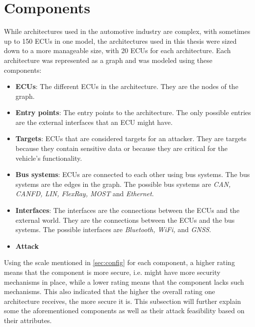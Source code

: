 \section{Components}
\label{sec:components}

While architectures used in the automotive industry are complex, with sometimes up to 150 ECUs in one model, 
the architectures used in this thesis were sized down to a more manageable size, with 20 ECUs for each architecture.
Each architecture was represented as a graph and was modeled using these components:

\begin{itemize}

    \item \textbf{ECUs}: The different ECUs in the architecture. They are the nodes of the graph.
    
    \item \textbf{Entry points}: The entry points to the architecture. The only possible entries are the external interfaces that an ECU might have.
    
    \item \textbf{Targets}: ECUs that are considered targets for an attacker. They are targets because they contain sensitive data or because they are critical for the vehicle's functionality.
    
    \item \textbf{Bus systems}: ECUs are connected to each other using bus systems. The bus systems are the edges in the graph. The possible bus systems are \textit{CAN, CANFD, LIN, FlexRay, MOST} and \textit{Ethernet}.
    
    \item \textbf{Interfaces}: The interfaces are the connections between the ECUs and the external world. They are the connections between the ECUs and the bus systems. The possible interfaces are \textit{Bluetooth, WiFi,} and \textit{GNSS}.
    
    \item \textbf{Attack }
    
\end{itemize}

Using the scale mentioned in \ref{sec:config} for each component, a higher rating means that the component is more secure, i.e. might have more security mechanisms in place,
while a lower rating means that the component lacks such mechanisms.
This also indicated that the higher the overall rating one architecture receives, the more secure it is.
This subsection will further explain some the aforementioned components as well as their attack feasibility based on their attributes.

